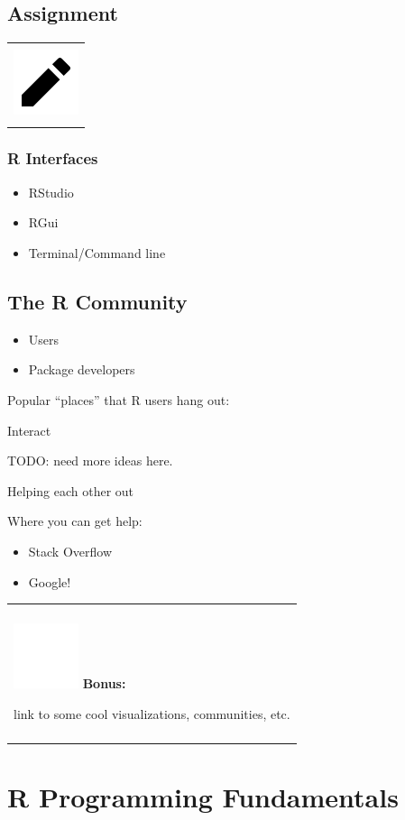 \documentclass[
]{book}
\providecommand{\tightlist}{%
  \setlength{\itemsep}{0pt}\setlength{\parskip}{0pt}}
\newenvironment{bonus}
{
  \begin{center}
  \begin{tabular}{|>{\columncolor{bonus}\color{white}}p{0.9\textwidth}|}\hline\\
  \includegraphics[scale=0.1]{src/images/sun-fill-invert.png}
  \textbf{Bonus:}
}
{\\\\\hline
  \end{tabular}
  \end{center}
}
\newenvironment{assessment}
{
  \begin{center}
  \begin{tabular}{|>{\columncolor{assessment}}p{0.9\textwidth}|}
  \hline\\
  \includegraphics[scale=0.1]{src/images/pencil-fill.png}
}
{\\\\\hline
  \end{tabular}
  \end{center}
}
\begin{document}
\hypertarget{assignment}{%
\section{Assignment}\label{assignment}}

\begin{assessment}

\end{assessment}

\hypertarget{r-interfaces-1}{%
\subsection{R Interfaces}\label{r-interfaces-1}}

\begin{itemize}
\tightlist
\item
  RStudio
\item
  RGui
\item
  Terminal/Command line
\end{itemize}

\hypertarget{the-r-community}{%
\section{The R Community}\label{the-r-community}}

\begin{itemize}
\tightlist
\item
  Users
\item
  Package developers
\end{itemize}

Popular ``places'' that R users hang out:

Interact

TODO: need more ideas here.

Helping each other out

Where you can get help:

\begin{itemize}
\tightlist
\item
  Stack Overflow
\item
  Google!
\end{itemize}

\begin{bonus}
link to some cool visualizations, communities, etc.
\end{bonus}

\hypertarget{r-programming-fundamentals}{%
\chapter{R Programming Fundamentals}\label{r-programming-fundamentals}}
\end{document}
